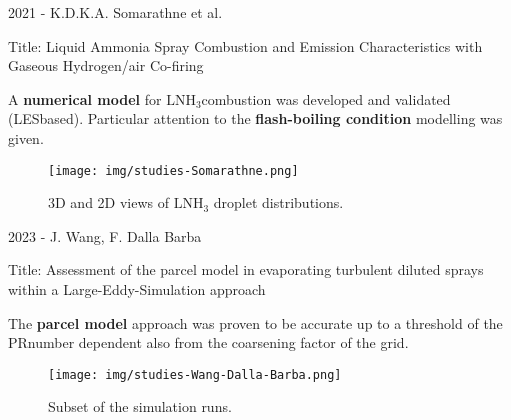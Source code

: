 \begin{frame}{2021 - K.D.K.A. Somarathne et al.}

    Title: Liquid Ammonia Spray Combustion and Emission Characteristics with Gaseous Hydrogen/air Co-firing

    A \textbf{numerical model} for $\mathrm{LNH_3}$\footnotemark[1] combustion was developed and validated (LES\footnotemark[2] based).
    Particular attention to the \textbf{flash-boiling condition} modelling was given.

    \vspace{9pt}

    \begin{figure}[H]
        \centering
        \texttt{[image: img/studies-Somarathne.png]}
        \caption{3D and 2D views of $\mathrm{LNH_3}$ droplet distributions.}
    \end{figure}


\end{frame}



\begin{frame}{2023 - J. Wang, F. Dalla Barba}

    Title: Assessment of the parcel model in evaporating turbulent diluted sprays within a Large-Eddy-Simulation approach

    The \textbf{parcel model} approach was proven to be accurate up to a threshold of the PR\footnotemark[1] number dependent also from the coarsening factor of the grid.

    \vspace{9pt}

    \begin{figure}[H]
        \centering
        \texttt{[image: img/studies-Wang-Dalla-Barba.png]}
        \caption{Subset of the simulation runs\footnotemark[2].}
    \end{figure}


\end{frame}



